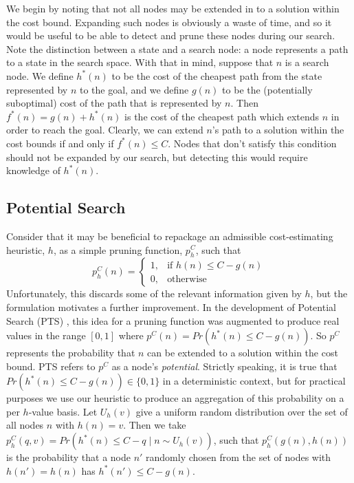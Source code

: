 \documentclass[letterpaper]{article} %
\begin{document}
We begin by noting that not all nodes may be extended in to a solution within the cost bound.
Expanding such nodes is obviously a waste of time, and so it would be useful to be able to detect and prune these nodes during our search.
Note the distinction between a state and a search node: a node represents a path to a state in the search space.
With that in mind, suppose that \(n\) is a search node.
We define \(h^*(n)\) to be the cost of the cheapest path from the state represented by \(n\) to the goal,
and we define \(g(n)\) to be the (potentially suboptimal) cost of the path that is represented by \(n\).
Then \(f^*(n) = g(n) + h^*(n)\) is the cost of the cheapest path which extends \(n\) in order to reach the goal.
Clearly, we can extend \(n\)'s path to a solution within the cost bounds if and only if \(f^*(n) \leq C\).
Nodes that don't satisfy this condition should not be expanded by our search, but detecting this would require knowledge of \(h^*(n)\).

\subsection{Potential Search}

Consider that it may be beneficial to repackage an admissible cost-estimating heuristic, \(h\), as a simple pruning function, \(p^C_h\), such that
\[
    p^C_h(n) = 
\begin{cases}
  1,& \text{if } h(n) \leq C - g(n) \\
  0,& \text{otherwise}
\end{cases}
\]
Unfortunately, this discards some of the relevant
information given by \(h\),
but the formulation motivates a further improvement.
In the development of Potential Search (PTS) \cite{stern2011potential},
this idea for a pruning function was augmented to produce real values in the range \([0, 1]\) where
\(p^C(n) = Pr(h^*(n) \leq C - g(n)) \).
So \(p^C\) represents
the probability that \(n\) can be extended to a solution within the cost bound.
PTS refers to \(p^C\) as a node's \textit{potential}.
Strictly speaking, it is true that \(Pr(h^*(n) \leq C - g(n)) \in \{0,1\}\) in a deterministic context,
but for practical purposes we use our heuristic to produce an aggregation of this probability on a per \(h\)-value basis.
Let \(U_h(v)\) give a uniform random distribution over the set of all nodes \(n\) with
\(h(n) = v\).
Then we take \(p^C_h(q, v) = Pr(h^*(n) \leq C - q \mid n \sim U_h(v))\),
such that \(p^C_h(g(n), h(n))\) is the probability that a node \(n'\) randomly chosen
from the set of nodes with \(h(n') = h(n)\) has \(h^*(n') \leq C - g(n)\).
\end{document}
